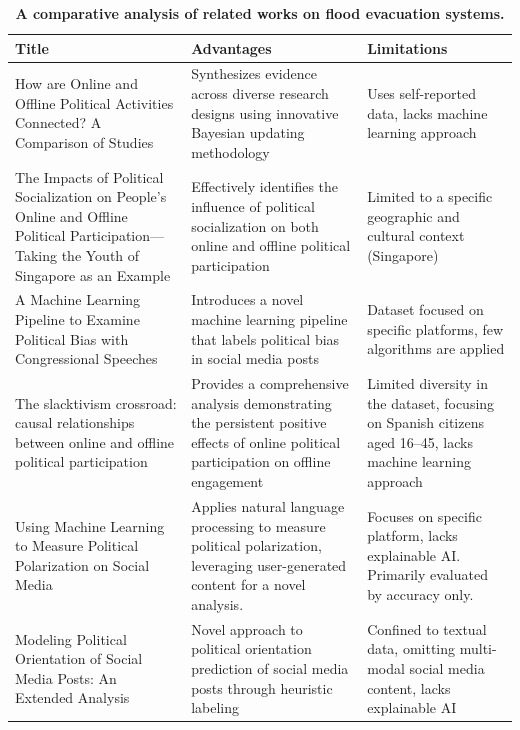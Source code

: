 \documentclass[pt]{article}  %
\begin{document}
\begin{table}[H] %
    \centering
    \begin{tabularx}{\textwidth}{|X|X|X|}
        \hline
        \textbf{Title} & \textbf{Advantages} & \textbf{Limitations} \\ \hline How are Online and Offline Political Activities Connected? A Comparison of Studies\cite{ref6} 
        & Synthesizes evidence across diverse research designs using innovative Bayesian updating methodology
        & Uses self-reported data, lacks machine learning approach \\ \hline
        The Impacts of Political Socialization on People’s Online and Offline Political Participation—Taking the Youth of Singapore as an Example\cite{ref7} 
        & Effectively identifies the influence of political socialization on both online and offline political participation 
        & Limited to a specific geographic and cultural context (Singapore) \\ \hline
        A Machine Learning Pipeline to Examine Political Bias with Congressional Speeches\cite{ref8} 
        & Introduces a novel machine learning pipeline that labels political bias in social media posts 
        & Dataset focused on specific platforms, few algorithms are applied \\ \hline
        The slacktivism crossroad: causal relationships between online and offline political participation\cite{ref9}
        & Provides a comprehensive analysis demonstrating the persistent positive effects of online political participation on offline engagement 
        & Limited diversity in the dataset, focusing on Spanish citizens aged 16–45, lacks machine learning approach \\ \hline


        Using Machine Learning to Measure Political Polarization on Social Media\cite{ref15}
        & Applies natural language processing to measure political polarization, leveraging user-generated content for a novel analysis. 
        & Focuses on specific platform, lacks explainable AI. Primarily evaluated by accuracy only.  \\ \hline
        

         Modeling Political Orientation of Social Media Posts: 
         An Extended Analysis\cite{ref10} 
        & Novel approach to political orientation prediction of social media posts through heuristic labeling 
        & Confined to textual data, omitting multi-modal social media content, lacks explainable AI \\ \hline

    \end{tabularx}
    \caption{\textbf{A comparative analysis of related works on flood evacuation systems.}}
    \label{tab:table1}
\end{table}
\end{document}
